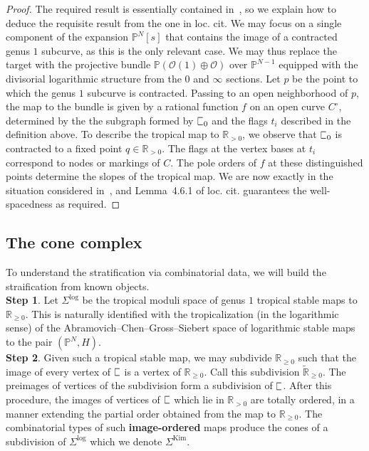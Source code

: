 \documentclass[11pt]{amsart}
\newcommand{\plC}{\scalebox{0.8}[1.3]{$\sqsubset$}}
\newcommand{\RR}{\mathbb{R}}
\theoremstyle{definition}
\theoremstyle{definition}
\begin{document}
\begin{proof}
The required result is essentially contained in~\cite[Section 4]{RSPW2}, so we explain how to deduce the requisite result from the one in loc. cit. We may focus on a single component of the expansion $\mathbb P^N[s]$ that contains the image of a contracted genus $1$ subcurve, as this is the only relevant case. We may thus replace the target with the projective bundle $\mathbb P(\mathcal O(1)\oplus \mathcal O)$ over $\mathbb P^{N-1}$ equipped with the divisorial logarithmic structure from the $0$ and $\infty$ sections. Let $p$ be the point to which the genus $1$ subcurve is contracted. Passing to an open neighborhood of $p$, the map to the bundle is given by a rational function $f$ on an open curve $C^\circ$, determined by the the subgraph formed by $\plC_0$ and the flags $t_i$ described in the definition above. To describe the tropical map to $\mathbb R_{>0}$, we observe that $\plC_0$ is contracted to a fixed point $q\in\mathbb R_{>0}$. The flags at the vertex bases at $t_i$ correspond to nodes or markings of $C$. The pole orders of $f$ at these distinguished points determine the slopes of the tropical map. We are now exactly in the situation considered in~\cite[Second Paragraph of Section~4.6]{RSPW2}, and Lemma~4.6.1 of loc. cit. guarantees the well-spacedness as required.
\end{proof}

\subsection{The cone complex} To understand the stratification via combinatorial data, we will build the straification from known objects. \\

\noindent
\textbf{Step 1}. Let $\Sigma^{\mathrm{log}}$ be the tropical moduli space of genus $1$ tropical stable maps to $\mathbb R_{\geq 0}$. This is naturally identified with the tropicalization (in the logarithmic sense) of the Abramovich--Chen--Gross--Siebert space of logarithmic stable maps to the pair $(\mathbb P^N,H)$. \\

\noindent
\textbf{Step 2}. Given such a tropical stable map, we may subdivide $\mathbb R_{\geq 0}$ such that the image of every vertex of $\plC$ is a vertex of $\mathbb R_{\geq 0}$. Call this subdivision $\widetilde{\mathbb R}_{\geq 0}$. The preimages of vertices of the subdivision form a subdivision of $\plC$. After this procedure, the images of vertices of $\plC$ which lie in $\RR_{>0}$ are totally ordered, in a manner extending the partial order obtained from the map to $\mathbb R_{\geq 0}$. The combinatorial types of such \textbf{image-ordered} maps produce the cones of a subdivision of $\Sigma^{\mathrm{log}}$ which we denote $\Sigma^{\mathrm{Kim}}$.\\
\end{document}
